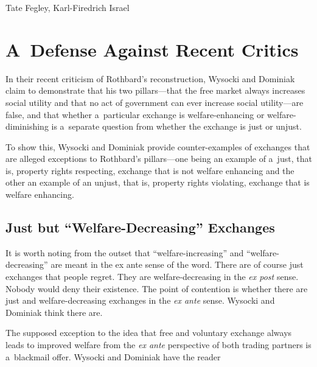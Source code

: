 \begin{artengenv2auth}{Tate Fegley, Karl-Firedrich Israel}
\section{A~Defense Against Recent Critics}

In their recent criticism of Rothbard's reconstruction, Wysocki and Dominiak 
\parencite*[][]{wysocki_how_2023} %
 claim to demonstrate that his two pillars---that the free market always increases social utility and that no act of government can ever increase social utility---are false, and that whether a~particular exchange is welfare-enhancing or welfare-diminishing is a~separate question from whether the exchange is just or unjust.



To show this, Wysocki and Dominiak 
\parencite*[][]{wysocki_how_2023} %
 provide counter-examples of exchanges that are alleged exceptions to Rothbard's pillars---one being an example of a~just, that is, property rights respecting, exchange that is not welfare enhancing and the other an example of an unjust, that is, property rights violating, exchange that is welfare enhancing.



\subsection{Just but ``Welfare-Decreasing'' Exchanges}



It is worth noting from the outset that ``welfare-increasing'' and ``welfare-decreasing'' are meant in the ex ante sense of the word. There are of course just exchanges that people regret. They are welfare-decreasing in the \textit{ex post} sense. Nobody would deny their existence. The point of contention is whether there are just and welfare-decreasing exchanges in the \textit{ex ante} sense. Wysocki and Dominiak 
\parencite*[][]{wysocki_how_2023} %
 think there are.



The supposed exception to the idea that free and voluntary exchange always leads to improved welfare from the \textit{ex ante} perspective of both trading partners is a~blackmail offer. Wysocki and Dominiak 
\parencite*[][p.22]{wysocki_how_2023} %
 have the reader




\end{artengenv2auth}

